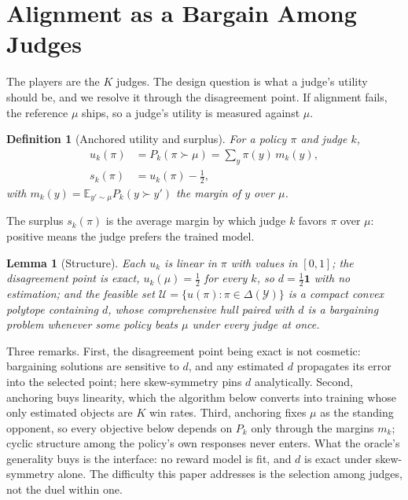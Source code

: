 \documentclass[letterpaper]{article} %
\newtheorem{lemma}{Lemma}
\newtheorem{definition}{Definition}
\newcommand{\Y}{\mathcal{Y}}
\newcommand{\U}{\mathcal{U}}
\newcommand{\E}{\mathbb{E}}
\begin{document}
\section{Alignment as a Bargain Among Judges}
\label{sec:bargain}
The players are the $K$ judges. The design question is what a judge's utility should be, and we resolve it through the disagreement point. If alignment fails, the reference $\mu$ ships, so a judge's utility is measured against $\mu$.

\begin{definition}[Anchored utility and surplus]
For a policy $\pi$ and judge $k$,
\begin{equation}
\begin{aligned}
u_k(\pi)&=P_k(\pi\succ\mu)=\textstyle\sum_y\pi(y)\,m_k(y),\\
s_k(\pi)&=u_k(\pi)-\tfrac12,
\end{aligned}
\label{eq:anchor}
\end{equation}
with $m_k(y)=\E_{y'\sim\mu}P_k(y\succ y')$ the margin of $y$ over $\mu$.
\end{definition}

The surplus $s_k(\pi)$ is the average margin by which judge $k$ favors $\pi$ over $\mu$: positive means the judge prefers the trained model.

\begin{lemma}[Structure]
\label{lem:struct}
Each $u_k$ is linear in $\pi$ with values in $[0,1]$; the disagreement point is exact, $u_k(\mu)=\tfrac12$ for every $k$, so $d=\tfrac12\mathbf 1$ with no estimation; and the feasible set $\U=\{u(\pi):\pi\in\Delta(\Y)\}$ is a compact convex polytope containing $d$, whose comprehensive hull paired with $d$ is a bargaining problem whenever some policy beats $\mu$ under every judge at once.
\end{lemma}

Three remarks. First, the disagreement point being exact is not cosmetic: bargaining solutions are sensitive to $d$, and any estimated $d$ propagates its error into the selected point; here skew-symmetry pins $d$ analytically. Second, anchoring buys linearity, which the algorithm below converts into training whose only estimated objects are $K$ win rates. Third, anchoring fixes $\mu$ as the standing opponent, so every objective below depends on $P_k$ only through the margins $m_k$; cyclic structure among the policy's own responses never enters. What the oracle's generality buys is the interface: no reward model is fit, and $d$ is exact under skew-symmetry alone. The difficulty this paper addresses is the selection among judges, not the duel within one.
\end{document}
